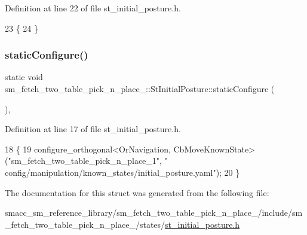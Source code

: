 Definition at line 22 of file st\+\_\+initial\+\_\+posture.\+h.


\begin{DoxyCode}
23     \{
24     \}
\end{DoxyCode}
\mbox{\label{structsm__fetch__two__table__pick__n__place__1_1_1StInitialPosture_ab8abb62d9e420ca12889a258f1ceddc1}} 
\subsubsection{\texorpdfstring{static\+Configure()}{staticConfigure()}}
{\footnotesize\ttfamily static void sm\+\_\+fetch\+\_\+two\+\_\+table\+\_\+pick\+\_\+n\+\_\+place\+\_\+::\+St\+Initial\+Posture\+::static\+Configure (\begin{DoxyParamCaption}{ }\end{DoxyParamCaption})\hspace{0.3cm}{\ttfamily [inline]}, {\ttfamily [static]}}



Definition at line 17 of file st\+\_\+initial\+\_\+posture.\+h.


\begin{DoxyCode}
18     \{
19         configure\_orthogonal<OrNavigation, CbMoveKnownState>(\textcolor{stringliteral}{"sm\_fetch\_two\_table\_pick\_n\_place\_1"}, \textcolor{stringliteral}{"
      config/manipulation/known\_states/initial\_posture.yaml"});
20     \}
\end{DoxyCode}


The documentation for this struct was generated from the following file\+:\begin{DoxyCompactItemize}
\item 
smacc\+\_\+sm\+\_\+reference\+\_\+library/sm\+\_\+fetch\+\_\+two\+\_\+table\+\_\+pick\+\_\+n\+\_\+place\+\_/include/sm\+\_\+fetch\+\_\+two\+\_\+table\+\_\+pick\+\_\+n\+\_\+place\+\_/states/\hyperlink{sm__fetch__two__table__pick__n__place__1_2include_2sm__fetch__two__table__pick__n__place__1_2states_2st__initial__posture_8h}{st\+\_\+initial\+\_\+posture.\+h}\end{DoxyCompactItemize}

